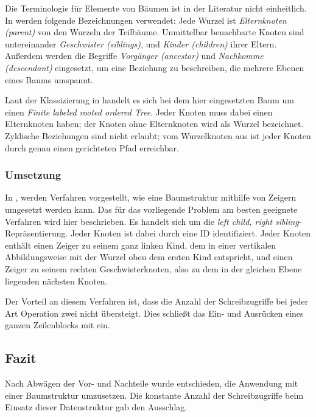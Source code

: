Die Terminologie für Elemente von Bäumen ist in der Literatur nicht einheitlich. In  werden folgende Bezeichnungen verwendet: Jede Wurzel ist \textit{Elternknoten (parent)} von den Wurzeln der Teilbäume. Unmittelbar benachbarte Knoten sind untereinander \textit{Geschwister (siblings)}, und \textit{Kinder (children)} ihrer Eltern. Außerdem werden die Begriffe \textit{Vorgänger (ancestor)} und \textit{Nachkomme (descendant)} eingesetzt, um eine Beziehung zu beschreiben, die mehrere Ebenen eines Baums umspannt. 

Laut der Klassizierung in  handelt es sich bei dem hier eingesetzten Baum um einen \textit{Finite labeled rooted ordered Tree}. Jeder Knoten muss dabei einen Elternknoten haben; der Knoten ohne Elternknoten wird als Wurzel bezeichnet. Zyklische Beziehungen sind nicht erlaubt; vom Wurzelknoten aus ist jeder Knoten durch genau einen gerichteten Pfad erreichbar.

\subsubsection{Umsetzung}
\label{subsec:baumumsetzung}

In , werden Verfahren vorgestellt, wie eine Baumstruktur mithilfe von Zeigern umgesetzt werden kann. Das für das vorliegende Problem am besten geeignete Verfahren wird hier beschrieben. Es handelt sich um die \textit{left child, right sibling}-Repräsentierung. Jeder Knoten ist dabei durch eine ID identifiziert. Jeder Knoten enthält einen Zeiger zu seinem ganz linken Kind, dem in einer vertikalen Abbildungsweise mit der Wurzel oben dem ersten Kind entspricht, und einen Zeiger zu seinem rechten Geschwisterknoten, also zu dem in der gleichen Ebene liegenden nächsten Knoten.

Der Vorteil an diesem Verfahren ist, dass die Anzahl der Schreibzugriffe bei jeder Art Operation zwei nicht übersteigt. Dies schließt das Ein- und Ausrücken eines ganzen Zeilenblocks mit ein.  

\subsection{Fazit}

Nach Abwägen der Vor- und Nachteile wurde entschieden, die Anwendung mit einer Baumstruktur umzusetzen. Die konstante Anzahl der Schreibzugriffe beim Einsatz dieser Datenstruktur gab den Ausschlag.

